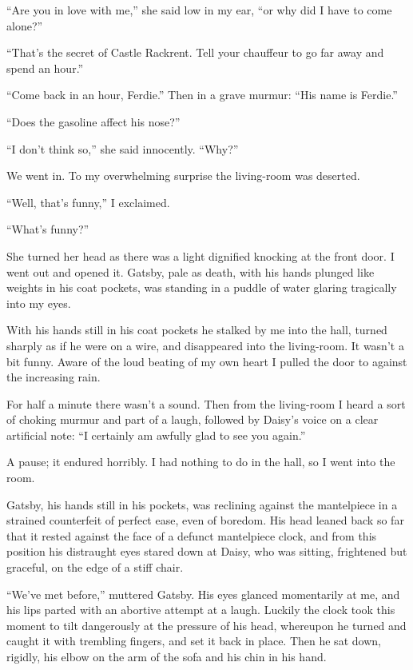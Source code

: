 \documentclass{znotebook}
\begin{document}
``Are you in love with me,'' she said low in my ear, ``or why did I have to come alone?''

``That's the secret of Castle Rackrent. Tell your chauffeur to go far away and spend an hour.''

``Come back in an hour, Ferdie.'' Then in a grave murmur: ``His name is Ferdie.''

``Does the gasoline affect his nose?''

``I don't think so,'' she said innocently. ``Why?''

We went in. To my overwhelming surprise the living-room was deserted.

``Well, that's funny,'' I exclaimed.

``What's funny?''

She turned her head as there was a light dignified knocking at the front door. I went out and opened it. Gatsby, pale as death, with his hands plunged like weights in his coat pockets, was standing in a puddle of water glaring tragically into my eyes.

With his hands still in his coat pockets he stalked by me into the hall, turned sharply as if he were on a wire, and disappeared into the living-room. It wasn't a bit funny. Aware of the loud beating of my own heart I pulled the door to against the increasing rain.

For half a minute there wasn't a sound. Then from the living-room I heard a sort of choking murmur and part of a laugh, followed by Daisy's voice on a clear artificial note: ``I certainly am awfully glad to see you again.''

A pause; it endured horribly. I had nothing to do in the hall, so I went into the room.

Gatsby, his hands still in his pockets, was reclining against the mantelpiece in a strained counterfeit of perfect ease, even of boredom. His head leaned back so far that it rested against the face of a defunct mantelpiece clock, and from this position his distraught eyes stared down at Daisy, who was sitting, frightened but graceful, on the edge of a stiff chair.

``We've met before,'' muttered Gatsby. His eyes glanced momentarily at me, and his lips parted with an abortive attempt at a laugh. Luckily the clock took this moment to tilt dangerously at the pressure of his head, whereupon he turned and caught it with trembling fingers, and set it back in place. Then he sat down, rigidly, his elbow on the arm of the sofa and his chin in his hand.
\end{document}

